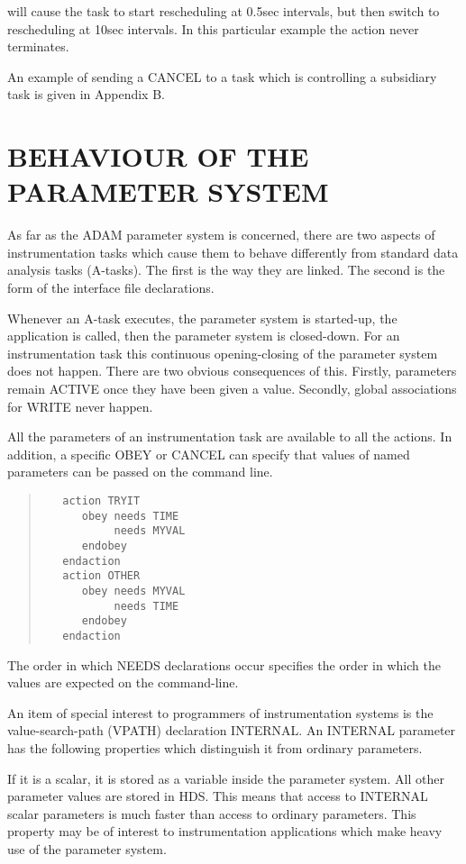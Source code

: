 will cause the task to start rescheduling at 0.5sec intervals, but then 
switch to rescheduling at 10sec intervals. In this particular example 
the action never terminates.

An example of sending a CANCEL to a task which is controlling a 
subsidiary task is given in Appendix B.

\section{BEHAVIOUR OF THE PARAMETER SYSTEM}

As far as the ADAM parameter system is concerned, there are two aspects 
of instrumentation tasks which cause them to behave differently from 
standard data analysis tasks (A-tasks). The first is the way they are 
linked. The second is the form of the interface file declarations.

Whenever an A-task executes, the parameter system is started-up, the 
application is called, then the parameter system is closed-down. For an 
instrumentation task this continuous opening-closing of the parameter 
system does not happen. There are two obvious consequences of this. 
Firstly, parameters remain ACTIVE once they have been given a value. 
Secondly, global associations for WRITE never happen.

All the parameters of an instrumentation task are available to all the 
actions. In addition, a specific OBEY or CANCEL can specify that values 
of named parameters can be passed on the command line.

\small \begin{quote} \begin{verbatim}
   action TRYIT
      obey needs TIME
           needs MYVAL
      endobey
   endaction
   action OTHER
      obey needs MYVAL
           needs TIME
      endobey
   endaction
\end{verbatim} \end{quote} \normalsize

The order in which NEEDS declarations occur specifies the order in 
which the values are expected on the command-line.

An item of special interest to programmers of instrumentation systems is 
the value-search-path (VPATH) declaration INTERNAL. An INTERNAL 
parameter has the following properties which distinguish it from 
ordinary parameters.

If it is a scalar, it is stored as a variable inside the parameter 
system. All other parameter values are stored in HDS. This means that 
access to INTERNAL scalar parameters is much faster than access to 
ordinary parameters. This property may be of interest to instrumentation 
applications which make heavy use of the parameter system.

